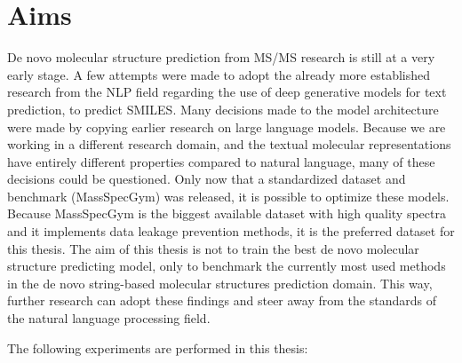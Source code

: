 \chapter{Aims}
\label{chap:aims}

De novo molecular structure prediction from \ac{MS/MS} research is still at a very early stage.
A few attempts were made to adopt the already more established research from the \ac{NLP} field regarding the use of deep generative models for text prediction, to predict SMILES.
Many decisions made to the model architecture were made by copying earlier research on large language models.
Because we are working in a different research domain, and the textual molecular representations have entirely different properties compared to natural language,
many of these decisions could be questioned.
Only now that a standardized dataset and benchmark (MassSpecGym) was released, it is possible to optimize these models.
Because MassSpecGym is the biggest available dataset with high quality spectra and it implements data leakage prevention methods, it is the preferred dataset for this thesis.
The aim of this thesis is not to train the best de novo molecular structure predicting model,
only to benchmark the currently most used methods in the de novo string-based molecular structures prediction domain.
This way, further research can adopt these findings and steer away from the standards of the natural language processing field.

The following experiments are performed in this thesis:

